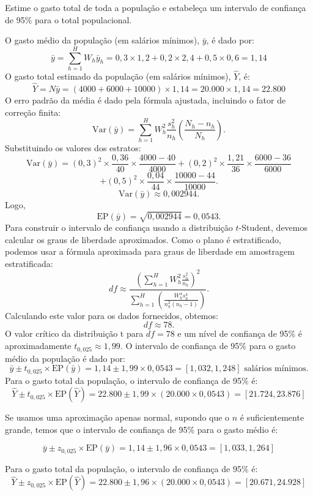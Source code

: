 \documentclass[a4paper,11pt,oneside,twocolumn]{Config/milktest}
\begin{document}
Estime o  gasto total de toda a população e estabeleça um intervalo de confiança de 95\% para o total populacional.
 

 {\scriptsize
		
		O gasto médio da população (em salários mínimos), $\bar{y}$, é dado por:\[
		\bar{y} = \sum_{h=1}^{H} W_h \bar{y}_h = 0,3 \times 1,2 + 0,2 \times 2,4 + 0,5 \times 0,6 = 1,14
		\] 
		O gasto total estimado da população (em salários mínimos), $\hat{Y}$, é:
		\[
		\hat{Y} = N \bar{y} = (4000 + 6000 + 10000) \times 1,14 = 20.000 \times 1,14 = 22.800 
		\]
		O erro padrão da média é dado pela fórmula ajustada, incluindo o fator de correção finita:
		\[
		\text{Var}(\bar{y}) = \sum_{h=1}^{H} W_h^2 \frac{s_h^2}{n_h} \left(\frac{N_h - n_h}{N_h}\right).
		\]
		Substituindo os valores dos estratos:
		\[
		\text{Var}(\bar{y}) = (0,3)^2 \times \frac{0,36}{40} \times \frac{4000 - 40}{4000} + (0,2)^2 \times \frac{1,21}{36} \times \frac{6000 - 36}{6000} 
		\]
		\[+ (0,5)^2 \times \frac{0,04}{44} \times \frac{10000 - 44}{10000}.
		\]
		\[
		\text{Var}(\bar{y}) \approx 0,002944.
		\] Logo, 
		\[
		\text{EP}(\bar{y}) = \sqrt{0,002944} = 0,0543.
		\]
		Para construir o intervalo de confiança usando a distribuição $t$-Student, devemos calcular os graus de liberdade aproximados. Como o plano é estratificado, podemos usar a fórmula aproximada para graus de liberdade em amostragem estratificada:
		\[
		df \approx \frac{\left(\sum_{h=1}^{H} W_h^2 \frac{s_h^2}{n_h} \right)^2}{\sum_{h=1}^{H} \left(\frac{W_h^4 s_h^4}{n_h^2 (n_h - 1)}\right)}.
		\]
		Calculando este valor para os dados fornecidos, obtemos:
		\[
		df \approx 78.
		\]
		O valor crítico da distribuição t para $df = 78$ e um nível de confiança de 95\% é aproximadamente $t_{0,025} \approx 1,99$.
		O intervalo de confiança de 95\% para o gasto médio da população é dado por:
		\[
		\bar{y} \pm t_{0,025} \times \text{EP}(\bar{y}) = 1,14 \pm 1,99 \times 0,0543 = [1,032, 1,248] \text{ salários mínimos.}
		\]
		Para o gasto total da população, o intervalo de confiança de 95\% é:
		\[
		\hat{Y} \pm t_{0,025} \times \text{EP}(\hat{Y}) = 22.800 \pm 1,99 \times (20.000 \times 0,0543) = [21.724, 23.876] 
		\]
		
		Se usamos uma aproximação apenas normal, supondo que o $n$ é suficientemente grande, temos que o intervalo de confiança de 95\% para o gasto médio é:
		
		\[
		\bar{y} \pm z_{0,025} \times \text{EP}(\bar{y}) = 1,14 \pm 1,96 \times 0,0543 = [1,033, 1,264] 
		\]
		
		Para o gasto total da população, o intervalo de confiança de 95\% é:
		\[
		\hat{Y} \pm z_{0,025} \times \text{EP}(\hat{Y}) = 22.800 \pm 1,96 \times (20.000 \times 0,0543) = [20.671, 24.928] 
		\]
}



\bigskip


\centering\color{cor}{\scshape boa prova}
\end{document}
